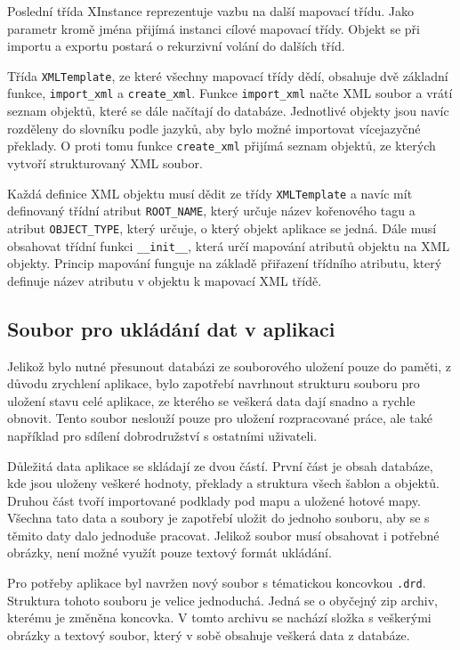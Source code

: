 \documentclass[thesis=B,czech]{resources/FITthesis}[2012/06/26]
\begin{document}
Poslední třída XInstance reprezentuje vazbu na další mapovací třídu. Jako parametr kromě jména přijímá instanci cílové mapovací třídy. Objekt se při importu a exportu postará o rekurzivní volání do dalších tříd. \par

Třída \texttt{XMLTemplate}, ze které všechny mapovací třídy dědí, obsahuje dvě základní funkce, \texttt{import\_xml} a \texttt{create\_xml}. Funkce \texttt{import\_xml} načte XML soubor a vrátí seznam objektů, které se dále načítají do databáze. Jednotlivé objekty jsou navíc rozděleny do slovníku podle jazyků, aby bylo možné importovat vícejazyčné překlady. O proti tomu funkce \texttt{create\_xml} přijímá seznam objektů, ze kterých vytvoří strukturovaný XML soubor. \par

Každá definice XML objektu musí dědit ze třídy \texttt{XMLTemplate} a navíc mít definovaný třídní atribut \texttt{ROOT\_NAME}, který určuje název kořenového tagu a atribut \texttt{OBJECT\_TYPE}, který určuje, o který objekt aplikace se jedná. Dále musí obsahovat třídní funkci \texttt{\_\_init\_\_}, která určí mapování atributů objektu na XML objekty. Princip mapování funguje na základě přiřazení třídního atributu, který definuje název atributu v objektu k mapovací XML třídě. 

	\subsection{Soubor pro ukládání dat v aplikaci}
Jelikož bylo nutné přesunout databázi ze souborového uložení pouze do paměti, z důvodu zrychlení aplikace, bylo zapotřebí navrhnout strukturu souboru pro uložení stavu celé aplikace, ze kterého se veškerá data dají snadno a rychle obnovit. Tento soubor neslouží pouze pro uložení rozpracované práce, ale také například pro sdílení dobrodružství s ostatními uživateli. \par

Důležitá data aplikace se skládají ze dvou částí. První část je obsah databáze, kde jsou uloženy veškeré hodnoty, překlady a struktura všech šablon a objektů. Druhou část tvoří importované podklady pod mapu a uložené hotové mapy. Všechna tato data a soubory je zapotřebí uložit do jednoho souboru, aby se s těmito daty dalo jednoduše pracovat. Jelikož soubor musí obsahovat i potřebné obrázky, není možné využít pouze textový formát ukládání. \par

Pro potřeby aplikace byl navržen nový soubor s tématickou koncovkou \texttt{.drd}. Struktura tohoto souboru je velice jednoduchá. Jedná se o obyčejný zip archiv, kterému je změněna koncovka. V tomto archivu se nachází složka s veškerými obrázky a textový soubor, který v sobě obsahuje veškerá data z databáze. \par
\end{document}
